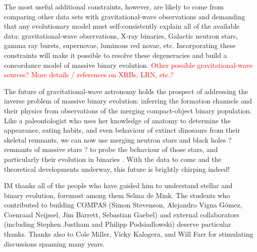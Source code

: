 \documentclass[iop,onecolumn]{revtex4}
\newcommand{\todo}[1]{\textcolor{red}{#1}}
\begin{document}
The most useful additional constraints, however, are likely to come from comparing other data sets with gravitational-wave observations and demanding that any evolutionary model must self-consistently explain all of the available data: gravitational-wave observations, X-ray binaries, Galactic neutron stars, gamma ray bursts, supernovae, luminous red novae, etc.   Incorporating these constraints will make it possible to resolve these degeneracies and build a concordance model of massive binary evolution.  \todo{Other possible gravitational-wave sources? More details / references on XRBs, LRN, etc.?}

The future of gravitational-wave astronomy holds the prospect of addressing the inverse problem of massive binary evolution: inferring the formation channels and their physics from observations of the merging compact-object binary population.  Like a paleontologist who uses her knowledge of anatomy to determine the appearance, eating habits, and even behaviour of extinct dinosaurs from their skeletal remnants, we can now use merging neutron stars and black holes ? remnants of massive stars ? to probe the behaviour of those stars, and particularly their evolution in binaries \citep{MandelFarmer:2017}.   With the data to come and the theoretical developments underway, this future is brightly chirping indeed!


\begin{acknowledgements}
IM thanks all of the people who have guided him to understand stellar and binary evolution, foremost among them Selma de Mink.   The students who contributed to building COMPAS (Simon Stevenson, Alejandro Vigna G\'{o}mez, Coenraad Neijssel, Jim Barrett, Sebastian Gaebel) and external collaborators (including Stephen Justham and Philipp Podsiadlowski) deserve particular thanks.  Thanks also to Cole Miller, Vicky Kalogera, and Will Farr for stimulating discussions spanning many years.
\end{acknowledgements}



\end{document}
